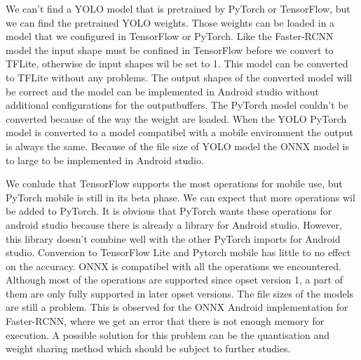 We can't find a YOLO model that is pretrained by PyTorch or TensorFlow, but we can find the pretrained YOLO weights.
Those weights can be loaded in a model that we configured in TensorFlow or PyTorch.
Like the Faster-RCNN model the input shape must be confined in TensorFlow before we convert to TFLite, otherwise de input shapes wil be set to 1.
This model can be converted to TFLite without any problems.
The output shapes of the converted model will be correct and the model can be implemented in Android studio without additional configurations for the outputbuffers.
The PyTorch model couldn't be converted because of the way the weight are loaded.
When the YOLO PyTorch model is converted to a model compatibel with a mobile environment the output is always the same.
Because of the file size of YOLO model the ONNX model is to large to be implemented in Android studio.

We conlude that TensorFlow supports the most operations for mobile use, but PyTorch mobile is still in its beta phase.
We can expect that more operations wil be added to PyTorch.
It is obvious that PyTorch wants these operations for android studio because there is already a library for Android studio.
However, this library doesn't combine well with the other PyTorch imports for Android studio.
Conversion to TensorFlow Lite and Pytorch mobile has little to no effect on the accuracy.
ONNX is compatibel with all the operations we encountered.
Although most of the operations are supported since opset version 1, a part of them are only fully supported in later opset versions.
The file sizes of the models are still a problem.
This is observed for the ONNX Android implementation for Faster-RCNN, where we get an error that there is not enough memory for execution.
A possible solution for this problem can be the quantisation and weight sharing method which should be subject to further studies.

